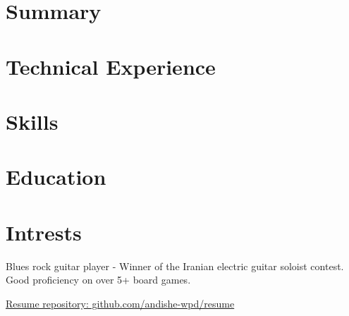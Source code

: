 \documentclass[letter,10pt]{article}
\begin{document}
\section{Summary}



\section{Technical Experience}


\section{Skills}


\section{Education}


\section{Intrests}
Blues rock guitar player - Winner of the Iranian electric guitar soloist contest.\\
Good proficiency on over 5+ board games.


             \item{}
             \item{}

\hfill \href{https://github.com/andishe-wpd/resume}{ Resume repository: github.com/andishe-wpd/resume}
\end{document}
